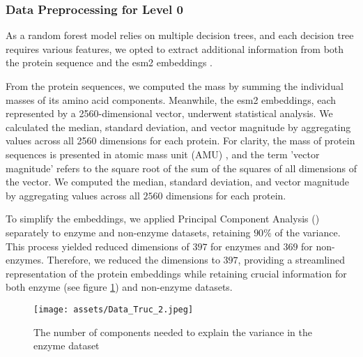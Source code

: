 \documentclass{bioinfo}
\begin{document}
\begin{methods}

\subsubsection{Data Preprocessing for Level 0}

As a random forest model relies on multiple decision trees, and each
decision tree requires various features, we opted to extract additional
information from both the protein sequence and the esm2 embeddings \cite{ESM2}.

From the protein sequences, we computed the mass by summing the individual masses of its amino acid components. 
Meanwhile, the esm2 embeddings, each represented by a 2560-dimensional vector, underwent statistical analysis.
We calculated the median, standard deviation, and vector magnitude by aggregating values across all 2560 dimensions for each protein.
For clarity, the mass of protein sequences is presented in atomic mass unit (AMU) ,
and the term 'vector magnitude' refers to the square root of the sum of the squares of all dimensions of the vector.
We computed the median, standard deviation, and vector magnitude by aggregating values across all $2560$ dimensions for each protein.

To simplify the embeddings, we applied Principal Component Analysis (\cite{scikit-learn})
separately to enzyme and non-enzyme datasets,
retaining $90\%$ of the variance. This process yielded reduced dimensions of $397$ for enzymes and $369$ for non-enzymes. 
Therefore, we reduced the dimensions to $397$, providing a streamlined representation of the protein embeddings while retaining crucial information for both 
enzyme (see figure \ref{fig:PCA_enzymes}) and non-enzyme datasets.

\begin{figure}[!tbp]
\texttt{[image: assets/Data\_Truc\_2.jpeg]}
\caption{The number of components needed to explain the variance in the enzyme dataset}\label{fig:PCA_enzymes}
\end{figure}




\end{methods}
\end{document}

